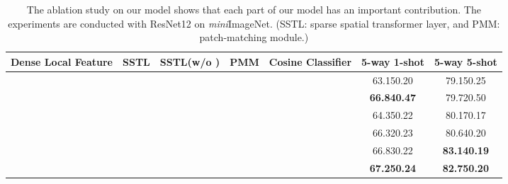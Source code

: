 \documentclass{SCIS2019}
\begin{document}
\begin{table}[t]
	\centering
	\caption{The ablation study on our model shows that each part of our model has an important contribution. The experiments are conducted with ResNet12 on \emph{mini}ImageNet. (SSTL: sparse spatial transformer layer, and PMM: patch-matching module.)}
	\begin{tabular*}{\hsize}{@{}@{\extracolsep{\fill}}ccccccc@{}}
\toprule
			\label{ablation}
			Dense Local Feature&SSTL&SSTL(w/o )&PMM& Cosine Classifier
			&5-way 1-shot & 5-way 5-shot\\
			\midrule	
			&\CheckmarkBold&&\CheckmarkBold&   & 63.15\footnotesize{0.20} & 79.15\footnotesize{0.25} \\
			\CheckmarkBold&&&\CheckmarkBold&   &\textbf{66.84\footnotesize{0.47}}  & 79.72\footnotesize{0.50} 	\\
			\CheckmarkBold&\CheckmarkBold&&& \CheckmarkBold  &64.35\footnotesize{0.22} & 80.17\footnotesize{0.17} \\
			\CheckmarkBold&\CheckmarkBold&\CheckmarkBold&&   	 &66.32\footnotesize{0.23} &80.64\footnotesize{0.20} \\
			\CheckmarkBold&\CheckmarkBold&&\CheckmarkBold&   	\CheckmarkBold &66.83\footnotesize{0.22} &\textbf{83.14\footnotesize{0.19}} \\
			\CheckmarkBold&\CheckmarkBold&&\CheckmarkBold&   	 &\textbf{67.25\footnotesize{0.24}} &\textbf{82.75\footnotesize{0.20}} \\
			\bottomrule
		\end{tabular*}
	\end{table}
\end{document}
